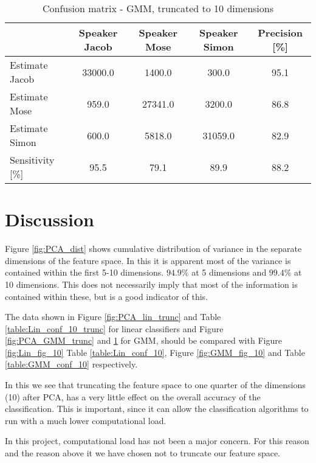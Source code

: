 \begin{table}[H]                                                    
\centering                                                          
\begin{tabular}{|l|c|c|c|c|}                                        
\hline                                                              
  & Speaker Jacob & Speaker Mose & Speaker Simon & Precision [\%] \\
\hline                                                              
Estimate Jacob & 33000.0 & 1400.0 & 300.0 & 95.1 \\                 
\hline                                                              
Estimate Mose & 959.0 & 27341.0 & 3200.0 & 86.8 \\                  
\hline                                                              
Estimate Simon & 600.0 & 5818.0 & 31059.0 & 82.9 \\                 
\hline                                                              
Sensitivity [\%] & 95.5 & 79.1 & 89.9 & 88.2 \\                     
\hline                                                              
\end{tabular}                                                       
\caption{Confusion matrix - GMM, truncated to 10 dimensions}        
\label{table:GMM_conf_10_trunc}                                     
\end{table} 



\section{Discussion}

Figure \ref{fig:PCA_dist} shows cumulative distribution of variance in the separate dimensions of the feature space.
In this it is apparent most of the variance is contained within the first 5-10 dimensions. 
$ 94.9 \% $ at 5 dimensions and $ 99.4 \% $ at 10 dimensions.
This does not necessarily imply that most of the information is contained within these, but is a good indicator of this.

The data shown in Figure \ref{fig:PCA_lin_trunc} and Table \ref{table:Lin_conf_10_trunc} for linear classifiers and Figure \ref{fig:PCA_GMM_trunc} and \ref{table:GMM_conf_10_trunc} for GMM, should be compared with Figure \ref{fig:Lin_fig_10} Table \ref{table:Lin_conf_10}, Figure \ref{fig:GMM_fig_10} and Table \ref{table:GMM_conf_10} respectively.

In this we see that truncating the feature space to one quarter of the dimensions (10) after PCA, has a very little effect on the overall accuracy of the classification.
This is important, since it can allow the classification algorithms to run with a much lower computational load.

In this project, computational load has not been a major concern. For this reason and the reason above it we have chosen not to truncate our feature space.